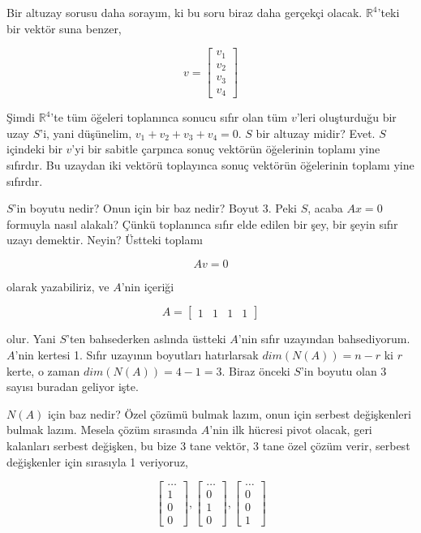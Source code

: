 \documentclass[12pt,fleqn]{article}\usepackage{../../common}
\begin{document}
Bir altuzay sorusu daha sorayım, ki bu soru biraz daha gerçekçi
olacak. $\mathbb{R}^4$'teki bir vektör suna benzer, 

$$ 
v = \left[\begin{array}{c}
v_1 \\ v_2 \\ v_3 \\ v_4
\end{array}\right]
 $$

Şimdi $\mathbb{R}^4$'te tüm öğeleri toplanınca sonucu sıfır olan tüm
$v$'leri oluşturduğu bir uzay $S$'i, yani düşünelim, $v_1 + v_2 + v_3 +
 v_4 = 0$. $S$ bir altuzay midir? Evet. $S$ içindeki bir $v$'yi bir sabitle çarpınca
sonuç vektörün öğelerinin toplamı yine sıfırdır. Bu uzaydan iki vektörü
toplayınca sonuç vektörün öğelerinin toplamı yine sıfırdır. 

$S$'in boyutu nedir? Onun için bir baz nedir? Boyut 3. Peki $S$, acaba
$Ax=0$ formuyla nasıl alakalı? Çünkü toplanınca sıfır elde edilen bir şey,
bir şeyin sıfır uzayı demektir. Neyin? Üstteki toplamı

$$ 
Av = 0
$$

olarak yazabiliriz, ve $A$'nin içeriği  

$$ A = \left[\begin{array}{rrrr}1 & 1 & 1 & 1\end{array}\right] $$

olur. Yani $S$'ten bahsederken aslında üstteki $A$'nin sıfır uzayından
bahsediyorum. $A$'nin kertesi 1. Sıfır uzayının boyutları hatırlarsak
$dim(N(A)) = n-r$ ki $r$ kerte, o zaman $dim(N(A)) = 4-1 = 3$. 
Biraz önceki $S$'in boyutu olan 3 sayısı buradan geliyor işte. 

$N(A)$ için baz nedir? Özel çözümü bulmak lazım, onun için serbest
değişkenleri bulmak lazım. Mesela çözüm sırasında $A$'nin ilk hücresi pivot
olacak, geri kalanları serbest değişken, bu bize 3 tane vektör, 3 tane özel
çözüm verir, serbest değişkenler için sırasıyla 1 veriyoruz, 

$$ 
\left[\begin{array}{c}
\ldots \\ 1 \\ 0 \\ 0
\end{array}\right], 
\left[\begin{array}{r}
\ldots  \\ 0 \\ 1 \\ 0
\end{array}\right], 
\left[\begin{array}{r}
\ldots  \\ 0 \\ 0 \\ 1
\end{array}\right]
 $$
\end{document}
